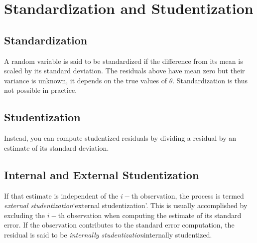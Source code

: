 \documentclass[residuals.tex]{subfiles}
\begin{document}
\Large


\newpage
\section{Standardization and Studentization}
\subsection{Standardization} %

A random variable is said to be standardized if the difference from its mean is scaled by its standard deviation. The residuals above have mean zero but their variance is unknown, it depends on the true values of $\theta$. Standardization is thus not possible in practice.

\subsection{Studentization} %
Instead, you can compute studentized residuals by dividing a residual by an estimate of its standard deviation. 

\subsection{Internal and External Studentization} %
If that estimate is independent of the $i-$th observation, the process is termed \emph{external studentization}`external studentization'. This is usually accomplished by excluding the $i-$th observation when computing the estimate of its standard error. If the observation contributes to the
standard error computation, the residual is said to be \emph{internally studentization}internally studentized.




\newpage
\end{document}
